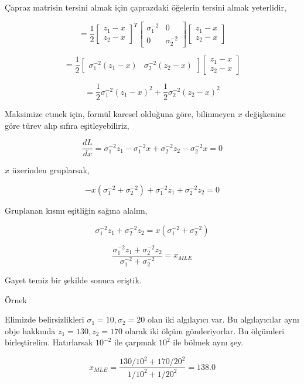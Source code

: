 \documentclass[12pt,fleqn]{article}\usepackage{../../common}
\begin{document}
Çapraz matrisin tersini almak için çaprazdaki öğelerin tersini almak
yeterlidir,

$$ = \frac{1}{2}  
\left[\begin{array}{c}
z_1-x \\ z_2-x
\end{array}\right]^T
\left[\begin{array}{cc}
\sigma_1^{-2} & 0 \\
0 & \sigma_2^{-2} 
\end{array}\right]
\left[\begin{array}{c}
z_1-x \\ z_2-x
\end{array}\right]
$$

$$ = \frac{1}{2}  
\left[\begin{array}{cc}
\sigma_1^{-2}(z_1-x) & \sigma_2^{-2} (z_2-x)
\end{array}\right]
\left[\begin{array}{c}
z_1-x \\ z_2-x
\end{array}\right]
$$

$$ = 
\frac{1}{2}\sigma_1^{-2}(z_1-x)^2 + \frac{1}{2}\sigma_2^{-2} (z_2-x)^2
$$

Maksimize etmek için, formül karesel olduğuna göre, bilinmeyen $x$
değişkenine göre türev alıp sıfıra eşitleyebiliriz,

$$ 
\frac{dL}{dx} = \sigma_1^{-2}z_1-\sigma_1^{-2}x + \sigma_2^{-2}z_2-\sigma_2^{-2}x = 0
$$

$x$ üzerinden gruplarsak,

$$ 
-x(\sigma_1^{-2}+\sigma_2^{-2}) + \sigma_1^{-2}z_1+ \sigma_2^{-2}z_2 = 0
$$

Gruplanan kısmı eşitliğin sağına alalım,

$$ 
\sigma_1^{-2}z_1+ \sigma_2^{-2}z_2 = x(\sigma_1^{-2}+\sigma_2^{-2}) 
$$

$$ 
\frac{\sigma_1^{-2}z_1+ \sigma_2^{-2}z_2 }{\sigma_1^{-2}+\sigma_2^{-2}}= x_{MLE}
$$

Gayet temiz bir şekilde sonuca eriştik. 

Örnek

Elimizde belirsizlikleri $\sigma_1=10,\sigma_2=20$ olan iki algılayıcı
var. Bu algılayıcılar aynı obje hakkında $z_1=130,z_2=170$ olarak iki ölçüm
gönderiyorlar. Bu ölçümleri birleştirelim. Hatırlarsak $10^{-2}$ ile
çarpmak $10^{2}$ ile bölmek aynı şey.

$$ x_{MLE} =
\frac{130/10^2 + 170/20^2}{1/10^2 + 1/20^2} = 138.0
$$
\end{document}
